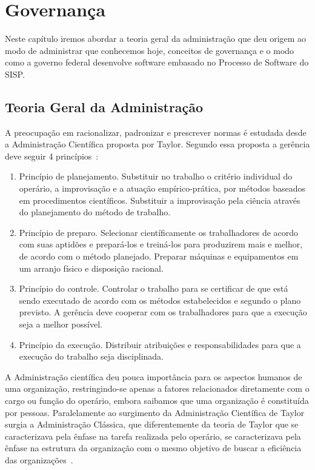 \chapter[Governança]{Governança}
\label{governanca}

Neste capítulo iremos abordar a teoria geral da administração que deu origem 
ao modo de administrar que conhecemos hoje, conceitos de governança e o modo 
como a governo federal desenvolve software embasado no Processo de Software
do SISP.

\section{Teoria Geral da Administração}

A preocupação em racionalizar, padronizar e prescrever normas é estudada desde a 
Administração Científica proposta por Taylor. Segundo essa proposta a gerência 
deve seguir 4 princípios~\cite{chiavenato2001teoria}:

\begin{enumerate}
\item Princípio de planejamento. Substituir no trabalho o critério individual 
do operário, a improvisação e a atuação empírico-prática, por métodos baseados 
em procedimentos científicos. Substituir a improvisação pela ciência através
do planejamento do método de trabalho.
 
\item Princípio de preparo. Selecionar científicamente os trabalhadores de acordo 
com suas aptidões e prepará-los e treiná-los para produzirem mais e melhor, de 
acordo com o método planejado. Preparar máquinas e equipamentos em um arranjo 
físico e disposição racional.

\item Princípio do controle. Controlar o trabalho para se certificar de que está 
sendo executado de acordo com os métodos estabelecidos e segundo o plano previsto. 
A gerência deve cooperar com os trabalhadores para que a execução seja a melhor 
possível.

\item Princípio da execução. Distribuir atribuições e responsabilidades para 
que a execução do trabalho seja disciplinada.
\end{enumerate}

A Administração científica deu pouca importância para os aspectos humanos de uma
organização, restringindo-se apenas a fatores relacionados diretamente com o 
cargo ou função do operário, embora saibamos que uma organização é constituída 
por pessoas.
%
Paralelamente ao surgimento da Administração Científica de Taylor surgia a 
Administração Clássica, que diferentemente da teoria de Taylor que se caracterizava
pela ênfase na tarefa realizada pelo operário, se caracterizava pela ênfase na 
estrutura da organização com o mesmo objetivo de buscar a eficiência das
organizações~\cite{chiavenato2001teoria}.

